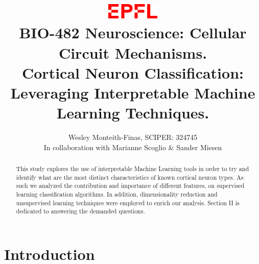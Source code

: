 \documentclass{IEEEtran}
\begin{document}
\title{
  \includegraphics[width=1in]{figures/logo.png}\\
  BIO-482 Neuroscience: Cellular Circuit Mechanisms.\\
Cortical Neuron Classification: Leveraging Interpretable Machine Learning Techniques.
}
\author{
  Wesley Monteith-Finas, SCIPER: 324745\\
In collaboration with Marianne Scoglio \& Sander Miesen
}
\maketitle





\begin{abstract}
  This study explores the use of interpretable Machine Learning tools in order to try and identify what are the most distinct characteristics of known cortical neuron types. As such we analyzed the contribution and importance of different features, on supervised learning classification algorithms. In addition, dimensionality reduction and unsupervised learning techniques were employed to enrich our analysis. 
  Section II is dedicated to answering the demanded questions.
\end{abstract}


\section{Introduction}

\end{document}
